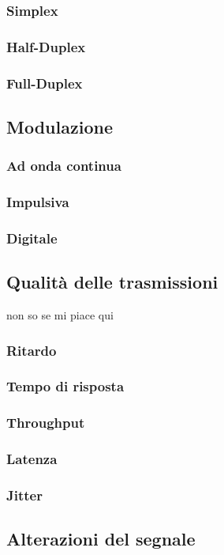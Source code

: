 \documentclass[a4paper,11pt]{paper}
\begin{document}
\subsubsection{Simplex}
\subsubsection{Half-Duplex}
\subsubsection{Full-Duplex}

\subsection{Modulazione}
\subsubsection{Ad onda continua}
\subsubsection{Impulsiva}
\subsubsection{Digitale}

\subsection{Qualità delle trasmissioni} non so se mi piace qui
\subsubsection{Ritardo}
\subsubsection{Tempo di risposta}
\subsubsection{Throughput}
\subsubsection{Latenza}
\subsubsection{Jitter}

\subsection{Alterazioni del segnale}
\end{document}
